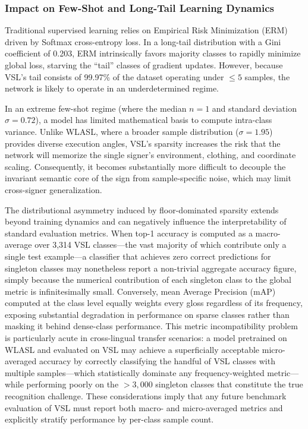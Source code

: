 \documentclass{ieeeaccess}
\begin{document}
\subsubsection{Impact on Few-Shot and Long-Tail Learning Dynamics}
Traditional supervised learning relies on Empirical Risk Minimization (ERM) driven by Softmax cross-entropy loss. In a long-tail distribution with a Gini coefficient of 0.203, ERM intrinsically favors majority classes to rapidly minimize global loss, starving the ``tail'' classes of gradient updates. However, because VSL's tail consists of 99.97\% of the dataset operating under $\le 5$ samples, the network is likely to operate in an underdetermined regime. 

In an extreme few-shot regime (where the median $n=1$ and standard deviation $\sigma=0.72$), a model has limited mathematical basis to compute intra-class variance. Unlike WLASL, where a broader sample distribution ($\sigma=1.95$) provides diverse execution angles, VSL's sparsity increases the risk that the network will memorize the single signer's environment, clothing, and coordinate scaling. Consequently, it becomes substantially more difficult to decouple the invariant semantic core of the sign from sample-specific noise, which may limit cross-signer generalization.

The distributional asymmetry induced by floor-dominated sparsity extends beyond training dynamics and can negatively influence the interpretability of standard evaluation metrics. When top-1 accuracy is computed as a macro-average over 3,314 VSL classes—the vast majority of which contribute only a single test example—a classifier that achieves zero correct predictions for singleton classes may nonetheless report a non-trivial aggregate accuracy figure, simply because the numerical contribution of each singleton class to the global metric is infinitesimally small. Conversely, mean Average Precision (mAP) computed at the class level equally weights every gloss regardless of its frequency, exposing substantial degradation in performance on sparse classes rather than masking it behind dense-class performance. This metric incompatibility problem is particularly acute in cross-lingual transfer scenarios: a model pretrained on WLASL and evaluated on VSL may achieve a superficially acceptable micro-averaged accuracy by correctly classifying the handful of VSL classes with multiple samples—which statistically dominate any frequency-weighted metric—while performing poorly on the $>3{,}000$ singleton classes that constitute the true recognition challenge. These considerations imply that any future benchmark evaluation of VSL must report both macro- and micro-averaged metrics and explicitly stratify performance by per-class sample count.
\end{document}
